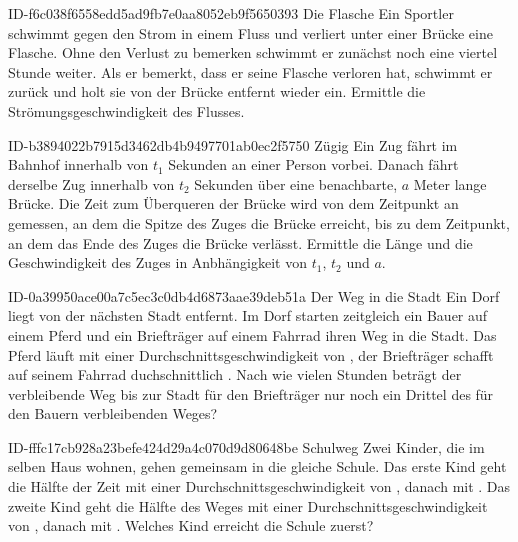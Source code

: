 \begin{exercise}
      {ID-f6c038f6558edd5ad9fb7e0aa8052eb9f5650393}
      {Die Flasche}
  \ifproblem\problem
    Ein Sportler schwimmt gegen den Strom in einem Fluss und verliert unter
    einer Brücke eine Flasche. Ohne den Verlust zu bemerken schwimmt er
    zunächst noch eine viertel Stunde weiter. Als er bemerkt, dass er seine
    Flasche verloren hat, schwimmt er zurück und holt sie  von der
    Brücke entfernt wieder ein. Ermittle die Strömungsgeschwindigkeit des
    Flusses.
  \fi
\end{exercise}

\begin{exercise}
      {ID-b3894022b7915d3462db4b9497701ab0ec2f5750}
      {Zügig}
  \ifproblem\problem
    Ein Zug fährt im Bahnhof innerhalb von $t_{1}$ Sekunden an einer Person vorbei.
    Danach fährt derselbe Zug innerhalb von $t_{2}$ Sekunden über eine benachbarte,
    $a$ Meter lange Brücke. Die Zeit zum Überqueren der Brücke wird von dem Zeitpunkt
    an gemessen, an dem die Spitze des Zuges die Brücke erreicht, bis zu dem
    Zeitpunkt, an dem das Ende des Zuges die Brücke verlässt.
    Ermittle die Länge und die Geschwindigkeit des Zuges in Anbhängigkeit von $t_{1}$,
    $t_{2}$ und $a$.
  \fi
\end{exercise}

\begin{exercise}
      {ID-0a39950ace00a7c5ec3c0db4d6873aae39deb51a}
      {Der Weg in die Stadt}
  \ifproblem\problem
    Ein Dorf liegt  von der nächsten Stadt entfernt. Im Dorf starten zeitgleich
    ein Bauer auf einem Pferd und ein Briefträger auf einem Fahrrad ihren Weg in die Stadt.
    Das Pferd läuft mit einer Durchschnittsgeschwindigkeit von , der Briefträger
    schafft auf seinem Fahrrad duchschnittlich . Nach wie vielen Stunden beträgt
    der verbleibende Weg bis zur Stadt für den Briefträger nur noch ein Drittel des für
    den Bauern verbleibenden Weges?
  \fi
\end{exercise}

\begin{exercise}
      {ID-fffc17cb928a23befe424d29a4c070d9d80648be}
      {Schulweg}
  \ifproblem\problem
    Zwei Kinder, die im selben Haus wohnen, gehen gemeinsam in die gleiche
    Schule. Das erste Kind geht die Hälfte der Zeit mit einer
    Durchschnittsgeschwindigkeit von , danach mit . Das
    zweite Kind geht die Hälfte des Weges mit einer Durchschnittsgeschwindigkeit
    von , danach mit . Welches Kind erreicht die Schule
    zuerst?
  \fi
\end{exercise}

